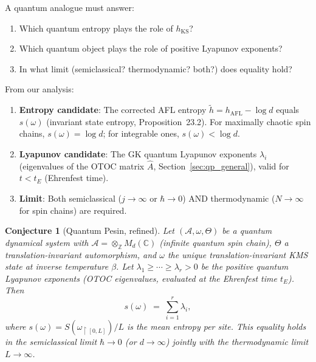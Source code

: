 \documentclass[12pt,a4paper]{article}
\newtheorem{conjecture}[theorem]{Conjecture}
\begin{document}
A quantum analogue must answer:
\begin{enumerate}
  \item Which quantum entropy plays the role of $h_{\mathrm{KS}}$?
  \item Which quantum object plays the role of positive Lyapunov exponents?
  \item In what limit (semiclassical? thermodynamic? both?) does equality hold?
\end{enumerate}

From our analysis:

\begin{enumerate}
  \item \textbf{Entropy candidate}: The corrected AFL entropy $\tilde{h} = h_{\mathrm{AFL}} - \log d$ equals $s(\omega)$ (invariant state entropy, Proposition~23.2).  For maximally chaotic spin chains, $s(\omega) = \log d$; for integrable ones, $s(\omega) < \log d$.
  \item \textbf{Lyapunov candidate}: The GK quantum Lyapunov exponents $\lambda_i$ (eigenvalues of the OTOC matrix $\hat{A}$, Section~\ref{sec:qp_general}), valid for $t < t_E$ (Ehrenfest time).
  \item \textbf{Limit}: Both semiclassical ($j\to\infty$ or $\hbar\to 0$) AND thermodynamic ($N\to\infty$ for spin chains) are required.
\end{enumerate}

\begin{conjecture}[Quantum Pesin, refined]\label{conj:quantum_pesin_refined}
Let $(\mathcal{A}, \omega, \Theta)$ be a quantum dynamical system with
$\mathcal{A} = \otimes_\mathbb{Z} M_d(\mathbb{C})$ (infinite quantum spin chain),
$\Theta$ a translation-invariant automorphism, and $\omega$ the unique
translation-invariant KMS state at inverse temperature $\beta$.  Let
$\lambda_1\geq\cdots\geq\lambda_r > 0$ be the positive quantum Lyapunov exponents
(OTOC eigenvalues, evaluated at the Ehrenfest time $t_E$).  Then
\[
  s(\omega) \;=\; \sum_{i=1}^r \lambda_i,
\]
where $s(\omega) = S(\omega_{\restriction [0,L]})/L$ is the mean entropy per site.
This equality holds in the semiclassical limit $\hbar\to 0$ (or $d\to\infty$)
jointly with the thermodynamic limit $L\to\infty$.
\end{conjecture}
\end{document}
